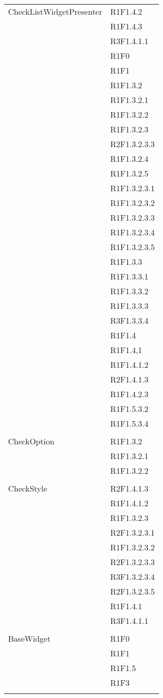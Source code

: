 \begin{center}
\begin{longtable}{|p{7cm}|p{5cm}|}
		CheckListWidgetPresenter & R1F1.4.2 \\ & R1F1.4.3 \\ & R3F1.4.1.1 \\ & R1F0 \\ & R1F1 \\ & R1F1.3.2 \\ & R1F1.3.2.1 \\ & R1F1.3.2.2 \\ & R1F1.3.2.3 \\ & R2F1.3.2.3.3 \\ & R1F1.3.2.4 \\ & R1F1.3.2.5 \\ & R1F1.3.2.3.1 \\ & R1F1.3.2.3.2 \\ & R1F1.3.2.3.3 \\ & R1F1.3.2.3.4 \\ & R1F1.3.2.3.5 \\ & R1F1.3.3 \\ & R1F1.3.3.1 \\ & R1F1.3.3.2 \\ & R1F1.3.3.3 \\ & R3F1.3.3.4 \\ & R1F1.4 \\ & R1F1.4,1 \\ & R1F1.4.1.2 \\ & R2F1.4.1.3 \\ & R1F1.4.2.3 \\ & R1F1.5.3.2 \\ & R1F1.5.3.4 \\ & \\ \hline
		CheckOption & R1F1.3.2 \\ & R1F1.3.2.1 \\ & R1F1.3.2.2 \\ & \\ \hline
		CheckStyle & R2F1.4.1.3 \\ & R1F1.4.1.2 \\ & R1F1.3.2.3 \\ & R2F1.3.2.3.1 \\ & R1F1.3.2.3.2 \\ & R2F1.3.2.3.3 \\ & R3F1.3.2.3.4 \\ & R2F1.3.2.3.5 \\ & R1F1.4.1 \\ & R3F1.4.1.1 \\ & \\ \hline
		BaseWidget & R1F0 \\ & R1F1 \\ & R1F1.5 \\ & R1F3 \\ & \\ \hline

\end{longtable}
\end{center}
